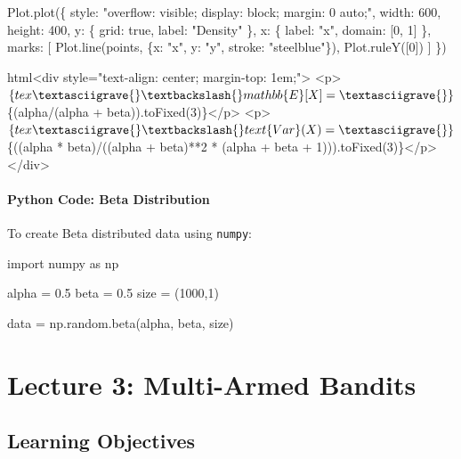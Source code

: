 \documentclass[
  letterpaper,
  DIV=11,
  numbers=noendperiod]{scrreprt}
\newenvironment{Shaded}{\begin{snugshade}}{\end{snugshade}}
\newcommand{\DecValTok}[1]{\textcolor[rgb]{0.68,0.00,0.00}{#1}}
\newcommand{\FloatTok}[1]{\textcolor[rgb]{0.68,0.00,0.00}{#1}}
\newcommand{\ImportTok}[1]{\textcolor[rgb]{0.00,0.46,0.62}{#1}}
\newcommand{\NormalTok}[1]{\textcolor[rgb]{0.00,0.23,0.31}{#1}}
\newcommand{\OperatorTok}[1]{\textcolor[rgb]{0.37,0.37,0.37}{#1}}
\begin{document}
\begin{Shaded}
\begin{Highlighting}[]
\NormalTok{Plot.plot(\{}
\NormalTok{  style: "overflow: visible; display: block; margin: 0 auto;",}
\NormalTok{  width: 600,}
\NormalTok{  height: 400,}
\NormalTok{  y: \{}
\NormalTok{    grid: true,}
\NormalTok{    label: "Density"}
\NormalTok{  \},}
\NormalTok{  x: \{}
\NormalTok{    label: "x",}
\NormalTok{    domain: [0, 1]}
\NormalTok{  \},}
\NormalTok{  marks: [}
\NormalTok{    Plot.line(points, \{x: "x", y: "y", stroke: "steelblue"\}),}
\NormalTok{    Plot.ruleY([0])}
\NormalTok{  ]}
\NormalTok{\})}

\NormalTok{html\textasciigrave{}\textless{}div style="text{-}align: center; margin{-}top: 1em;"\textgreater{}}
\NormalTok{  \textless{}p\textgreater{}$\{tex\textasciigrave{}\textbackslash{}mathbb\{E\}[X] =\textasciigrave{}\} $\{(alpha/(alpha + beta)).toFixed(3)\}\textless{}/p\textgreater{}}
\NormalTok{  \textless{}p\textgreater{}$\{tex\textasciigrave{}\textbackslash{}text\{Var\}(X) =\textasciigrave{}\} $\{((alpha * beta)/((alpha + beta)**2 * (alpha + beta + 1))).toFixed(3)\}\textless{}/p\textgreater{}}
\NormalTok{\textless{}/div\textgreater{}\textasciigrave{}}
\end{Highlighting}
\end{Shaded}

\subsection{Python Code: Beta
Distribution}\label{python-code-beta-distribution}

To create Beta distributed data using \texttt{numpy}:

\begin{Shaded}
\begin{Highlighting}[]
\ImportTok{import}\NormalTok{ numpy }\ImportTok{as}\NormalTok{ np }

\NormalTok{alpha }\OperatorTok{=} \FloatTok{0.5}
\NormalTok{beta }\OperatorTok{=} \FloatTok{0.5}
\NormalTok{size }\OperatorTok{=}\NormalTok{ (}\DecValTok{1000}\NormalTok{,}\DecValTok{1}\NormalTok{)}

\NormalTok{data }\OperatorTok{=}\NormalTok{ np.random.beta(alpha, beta, size)}
\end{Highlighting}
\end{Shaded}

\part{Lecture 3: Multi-Armed Bandits}

\chapter{Learning Objectives}\label{learning-objectives-1}
\end{document}
